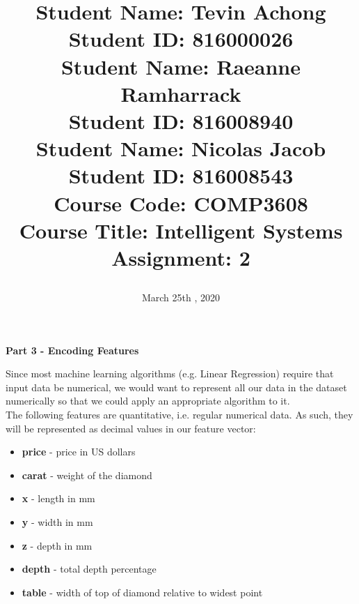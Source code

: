 \documentclass[a4paper, 12pt]{article}
\begin{document}
\title{
		\textbf{Student Name:} Tevin Achong\\
		\textbf{Student ID:} 816000026\\
		\textbf{Student Name:} Raeanne Ramharrack\\
		\textbf{Student ID:} 816008940\\			
		\textbf{Student Name:} Nicolas Jacob\\
		\textbf{Student ID:} 816008543\\			
		\textbf{Course Code:} COMP3608\\
		\textbf{Course Title:} Intelligent Systems\\
		\textbf{Assignment:} 2
		\date{March 25th , 2020}
}
\maketitle

\newpage
{}

\begin{center}
	\textbf{Part 3 - Encoding Features}
\end{center}

Since most machine learning algorithms (e.g. Linear Regression) require that input data be numerical, we would want to represent all our data in the dataset numerically so that we could apply an appropriate algorithm to it.\\

The following features are quantitative, i.e. regular numerical data. As such, they will be represented as decimal values in our feature vector:
\begin{itemize}
\item
\textbf{price} - price in US dollars
\item
\textbf{carat} - weight of the diamond
\item
\textbf{x} - length in mm
\item
\textbf{y} - width in mm
\item
\textbf{z} - depth in mm
\item
\textbf{depth} - total depth percentage
\item
\textbf{table} - width of top of diamond relative to widest point
\end{itemize}
\end{document}
